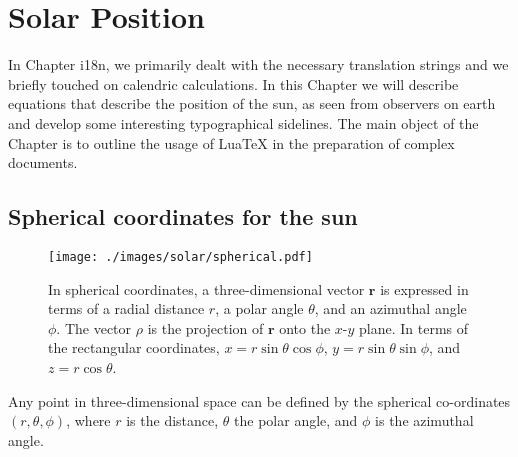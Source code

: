 

\newcommand{\be}{\begin{equation}}
\newcommand{\ee}{\end{equation}}
\newcommand{\vv}[1]{\mathbf #1}						%
\newcommand{\la}[1]{\label{#1}}
\newcommand{\Eq}[1]{Eq.~(\ref{#1})}
\newcommand{\Eqs}[2]{Eqs.~(\ref{#1},\ref{#2})}
\newcommand{\bea}{\begin{eqnarray}}
\newcommand{\eea}{\end{eqnarray}}
\newcommand{\Sec}[1]{Sec.~\ref{#1}}
\newcommand{\Secs}[2]{Secs.~\ref{#1}, \ref{#2}}

\newcommand{\Fig}[1]{Fig.~\ref{#1}}
\def\nn{\nonumber \\ }

\chapter{Solar Position}
\label{ch:solar}

In Chapter i18n, we primarily dealt with the necessary translation strings and we briefly touched on 
calendric calculations. In this Chapter we will describe equations that describe the position of the sun, as seen from observers on earth and develop some interesting typographical sidelines. The main object of the Chapter is to outline the usage of LuaTeX in the preparation of complex documents.

\section{Spherical coordinates for the sun}

\begin{figure} [tbh]
\begin{center}
	\texttt{[image: ./images/solar/spherical.pdf]}
\end{center}
\caption{\small In spherical coordinates, a three-dimensional vector $\vv r$ is expressed in terms of a radial distance $r$, a polar angle $\theta$, and an azimuthal angle $\phi$.  The vector {\boldmath $\rho$} is the projection of $\vv r$ onto the $x$-$y$ plane.  In terms of the rectangular coordinates, $x = r \sin \theta \cos \phi$, $y = r \sin \theta \sin \phi$, and $z = r \cos \theta$.\la{fig:spherical}}
\end{figure}
Any point in three-dimensional space can be defined by the spherical co-ordinates $(r, \theta, \phi)$, where $r$ is the distance, $\theta$ the polar angle, and $\phi$ is the azimuthal angle. 

